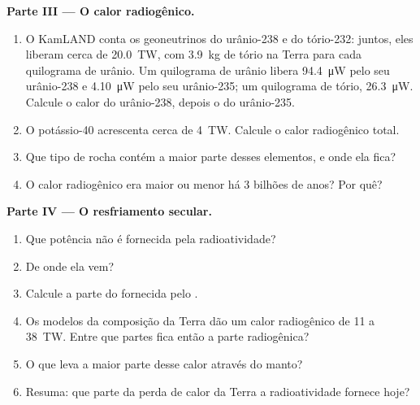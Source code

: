 \begin{problem}
\medskip
\noindent\textbf{Parte III --- O calor radiogênico.}
\begin{enumerate}[resume]
  \item O KamLAND conta os geoneutrinos do urânio-238 e do tório-232: juntos,
        eles liberam cerca de \qty{20.0}{TW}, com \qty{3.9}{kg} de tório na
        Terra para cada quilograma de urânio. Um quilograma de urânio libera
        \qty{94.4}{\micro W} pelo seu urânio-238 e \qty{4.10}{\micro W} pelo
        seu urânio-235; um quilograma de tório, \qty{26.3}{\micro W}.
        Calcule o calor do urânio-238, depois o do urânio-235.
  \item O potássio-40 acrescenta cerca de \qty{4}{TW}. Calcule o calor
        radiogênico total.
  \item Que tipo de rocha contém a maior parte desses elementos, e onde ela
        fica?
  \item O calor radiogênico era maior ou menor há 3 bilhões de anos? Por quê?
\end{enumerate}

\medskip
\noindent\textbf{Parte IV --- O resfriamento secular.}
\begin{enumerate}[resume]
  \item Que potência não é fornecida pela radioatividade?
  \item De onde ela vem?
  \item Calcule a parte do  fornecida pelo .
  \item Os modelos da composição da Terra dão um calor radiogênico de 11 a
        \qty{38}{TW}.
        Entre que partes fica então a parte radiogênica?
  \item O que leva a maior parte desse calor através do manto?
  \item Resuma: que parte da perda de calor da Terra a radioatividade
        fornece hoje?
\end{enumerate}
\end{problem}

